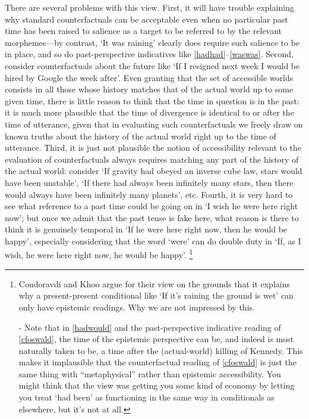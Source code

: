 \documentclass[If.tex]{subfiles}
\begin{document}
There are several problems with this view. First, it will have trouble explaining why standard counterfactuals can be acceptable even when no particular past time has been raised to salience as a target to be referred to by the relevant morphemes---by contrast, ‘It was raining’ clearly does require such salience to be in place, and so do past-perspective indicatives like \ref{hadhad}--\ref{waswas}. Second, consider counterfactuals about the future like ‘If I resigned next week I would be hired by Google the week after’. Even granting that the set of accessible worlds consists in all those whose history matches that of the actual world up to some given time, there is little reason to think that the time in question is in the past: it is much more plausible that the time of divergence is identical to or after the time of utterance, given that in evaluating such counterfactuals we freely draw on known truths about the history of the actual world right up to the time of utterance. Third, it is just not plausible the notion of accessibility relevant to the evaluation of counterfactuals always requires matching any part of the history of the actual world: consider ‘If gravity had obeyed an inverse cube law, stars would have been unstable’, ‘If there had always been infinitely many stars, then there would always have been infinitely many planets’, etc. Fourth, it is very hard to see what reference to a past time could be going on in ‘I wish he were here right now’; but once we admit that the past tense is fake here, what reason is there to think it is genuinely temporal in ‘If he were here right now, then he would be happy’, especially considering that the word ‘were’ can do double duty in ‘If, as I wish, he were here right now, he would be happy’.%
\footnote{\*\*\*Condoravdi and Khoo argue for their view on the grounds that it explains why a present-present conditional like ‘If it's raining the ground is wet’ can only have epistemic readings.  Why we are not impressed by this.

	- Note that in \ref{hadwould} and the past-perspective indicative reading of \ref{cfoswald}, the time of the epistemic perspective can be, and indeed is most naturally taken to be, a time after the (actual-world) killing of Kennedy. This makes it implausible that the counterfactual reading of \ref{cfoswald} is just the same thing with “metaphysical” rather than epistemic accessibility. You might think that the view was getting you some kind of economy by letting you treat ‘had been’ as functioning in the same way in conditionals as elsewhere, but it's not at all.}
\end{document}
